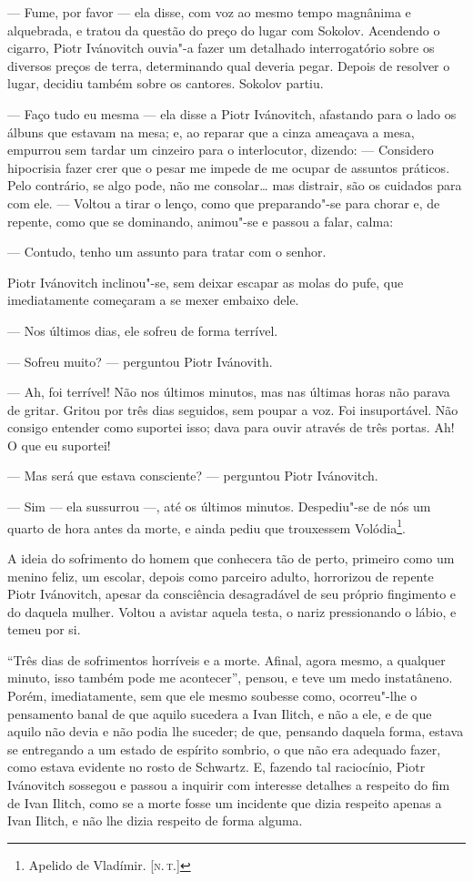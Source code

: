 --- Fume, por favor --- ela disse, com voz ao mesmo tempo magnânima e
alquebrada, e tratou da questão do preço do lugar com Sokolov. Acendendo
o cigarro, Piotr Ivánovitch ouvia"-a fazer um detalhado interrogatório
sobre os diversos preços de terra, determinando qual deveria pegar.
Depois de resolver o lugar, decidiu também sobre os cantores. Sokolov
partiu.

--- Faço tudo eu mesma --- ela disse a Piotr Ivánovitch, afastando para o
lado os álbuns que estavam na mesa; e, ao reparar que a cinza ameaçava a
mesa, empurrou sem tardar um cinzeiro para o interlocutor, dizendo: ---
Considero hipocrisia fazer crer que o pesar me impede de me ocupar de
assuntos práticos. Pelo contrário, se algo pode, não me consolar\ldots{} mas
distrair, são os cuidados para com ele. --- Voltou a tirar o lenço, como
que preparando"-se para chorar e, de repente, como que se dominando,
animou"-se e passou a falar, calma:

--- Contudo, tenho um assunto para tratar com o senhor.

Piotr Ivánovitch inclinou"-se, sem deixar escapar as molas do pufe, que
imediatamente começaram a se mexer embaixo dele.

--- Nos últimos dias, ele sofreu de forma terrível.

--- Sofreu muito? --- perguntou Piotr Ivánovith.

--- Ah, foi terrível! Não nos últimos minutos, mas nas últimas horas não
parava de gritar. Gritou por três dias seguidos, sem poupar a voz. Foi
insuportável. Não consigo entender como suportei isso; dava para ouvir
através de três portas. Ah! O que eu suportei!

--- Mas será que estava consciente? --- perguntou Piotr Ivánovitch.

--- Sim --- ela sussurrou ---, até os últimos minutos. Despediu"-se de nós um
quarto de hora antes da morte, e ainda pediu que trouxessem
Volódia\footnote{Apelido de Vladímir. {[}\textsc{n.\,t.}{]}}.

A ideia do sofrimento do homem que conhecera tão de perto, primeiro como
um menino feliz, um escolar, depois como parceiro adulto, horrorizou de
repente Piotr Ivánovitch, apesar da consciência desagradável de seu
próprio fingimento e do daquela mulher. Voltou a avistar aquela testa, o
nariz pressionando o lábio, e temeu por si.

``Três dias de sofrimentos horríveis e a morte. Afinal, agora mesmo, a
qualquer minuto, isso também pode me acontecer'', pensou, e teve um medo
instatâneno. Porém, imediatamente, sem que ele mesmo soubesse como,
ocorreu"-lhe o pensamento banal de que aquilo sucedera a Ivan Ilitch, e
não a ele, e de que aquilo não devia e não podia lhe suceder; de que,
pensando daquela forma, estava se entregando a um estado de espírito
sombrio, o que não era adequado fazer, como estava evidente no rosto de
Schwartz. E, fazendo tal raciocínio, Piotr Ivánovitch sossegou e passou
a inquirir com interesse detalhes a respeito do fim de Ivan Ilitch, como
se a morte fosse um incidente que dizia respeito apenas a Ivan Ilitch, e
não lhe dizia respeito de forma alguma.

